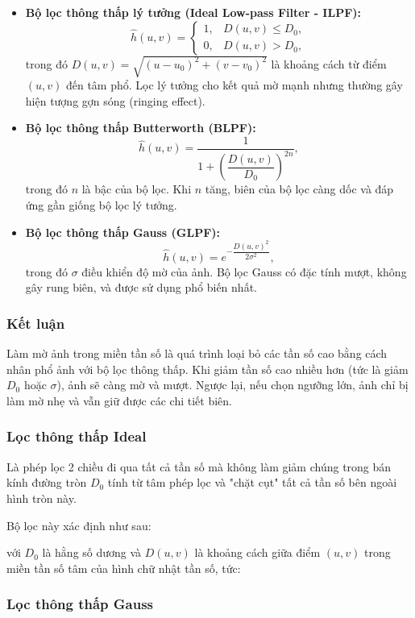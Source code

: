\documentclass[12pt,a4paper]{report}
\numberwithin{equation}{section}
\theoremstyle{definition} %
\begin{document}
\begin{itemize}
	\item \textbf{Bộ lọc thông thấp lý tưởng (Ideal Low-pass Filter - ILPF):}
	\[
	\hat{h}(u,v) =
	\begin{cases}
	1, & D(u,v) \le D_0,\\
	0, & D(u,v) > D_0,
	\end{cases}
	\]
	trong đó $D(u,v) = \sqrt{(u-u_0)^2 + (v-v_0)^2}$ là khoảng cách từ điểm $(u,v)$ đến tâm phổ.  
	Lọc lý tưởng cho kết quả mờ mạnh nhưng thường gây hiện tượng gợn sóng (ringing effect).

	\item \textbf{Bộ lọc thông thấp Butterworth (BLPF):}
	\[
	\hat{h}(u,v) = \frac{1}{1 + \left(\dfrac{D(u,v)}{D_0}\right)^{2n}},
	\]
	trong đó $n$ là bậc của bộ lọc. Khi $n$ tăng, biên của bộ lọc càng dốc và đáp ứng gần giống bộ lọc lý tưởng.

	\item \textbf{Bộ lọc thông thấp Gauss (GLPF):}
	\[
	\hat{h}(u,v) = e^{-\dfrac{D(u,v)^2}{2\sigma^2}},
	\]
	trong đó $\sigma$ điều khiển độ mờ của ảnh. Bộ lọc Gauss có đặc tính mượt, không gây rung biên, và được sử dụng phổ biến nhất.
\end{itemize}

\subsubsection*{Kết luận}
Làm mờ ảnh trong miền tần số là quá trình loại bỏ các tần số cao bằng cách nhân phổ ảnh với bộ lọc thông thấp.  
Khi giảm tần số cao nhiều hơn (tức là giảm $D_0$ hoặc $\sigma$), ảnh sẽ càng mờ và mượt.  
Ngược lại, nếu chọn ngưỡng lớn, ảnh chỉ bị làm mờ nhẹ và vẫn giữ được các chi tiết biên.

\subsubsection{Lọc thông thấp Ideal}

Là phép lọc 2 chiều đi qua tất cả tần số mà không làm giảm chúng trong bán kính đường tròn $D_0$ tính từ tâm phép lọc và "chặt cụt" tất cả tần số bên ngoài hình tròn này.

Bộ lọc này xác định như sau:

với $D_0$ là hằng số dương và $D(u,v)$ là khoảng cách giữa điểm $(u,v)$ trong miền tần số tâm của hình chữ nhật tần số, tức:
\subsubsection{Lọc thông thấp Gauss}
\end{document}

